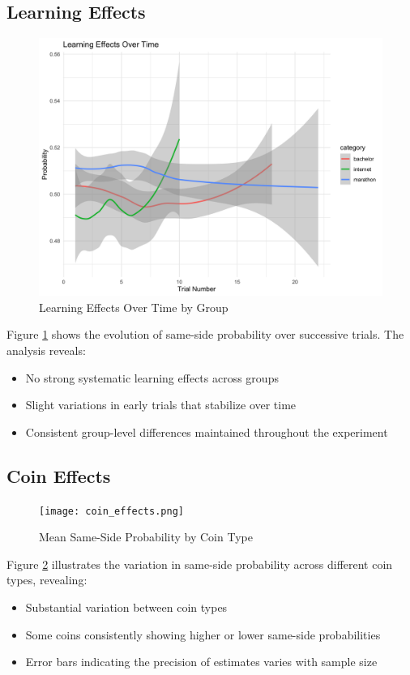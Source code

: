 \documentclass[12pt,a4paper]{article}
\begin{document}
\subsection{Learning Effects}
\begin{figure}[h!]
    \centering
    \includegraphics[width=0.8\linewidth]{learning_effects.png}
    \caption{Learning Effects Over Time by Group}
    \label{fig:learning}
\end{figure}

Figure \ref{fig:learning} shows the evolution of same-side probability over successive trials. The analysis reveals:
\begin{itemize}
    \item No strong systematic learning effects across groups
    \item Slight variations in early trials that stabilize over time
    \item Consistent group-level differences maintained throughout the experiment
\end{itemize}

\subsection{Coin Effects}
\begin{figure}[h!]
    \centering
    \texttt{[image: coin\_effects.png]}
    \caption{Mean Same-Side Probability by Coin Type}
    \label{fig:coin-effects}
\end{figure}

Figure \ref{fig:coin-effects} illustrates the variation in same-side probability across different coin types, revealing:
\begin{itemize}
    \item Substantial variation between coin types
    \item Some coins consistently showing higher or lower same-side probabilities
    \item Error bars indicating the precision of estimates varies with sample size
\end{itemize}
\end{document}
